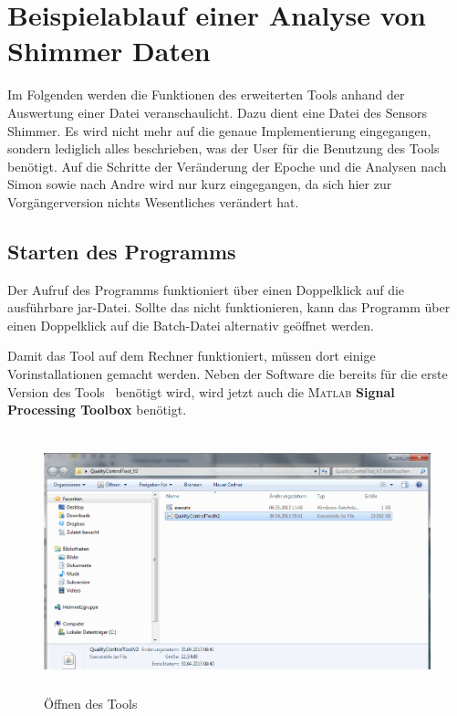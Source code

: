 \documentclass[onecolumn,german]{article}
\begin{document}
\section{Beispielablauf einer Analyse von Shimmer Daten}\label{Beispielablauf}

Im Folgenden werden die Funktionen des erweiterten Tools anhand der Auswertung einer Datei veranschaulicht. Dazu dient eine Datei des Sensors Shimmer. Es wird nicht mehr auf die genaue Implementierung eingegangen, sondern lediglich alles beschrieben, was der User für die Benutzung des Tools benötigt.
Auf die Schritte der Veränderung der Epoche und die Analysen nach Simon sowie nach Andre wird nur kurz eingegangen, da sich hier zur Vorgängerversion nichts Wesentliches verändert hat.

\subsection{Starten des Programms}
Der Aufruf des Programms funktioniert über einen Doppelklick auf die ausführbare jar-Datei. Sollte das nicht funktionieren, kann das Programm über einen Doppelklick auf die Batch-Datei alternativ geöffnet werden.\newline

Damit das Tool auf dem Rechner funktioniert, müssen dort einige Vorinstallationen gemacht werden. Neben der Software die bereits für die erste Version des Tools~\cite{idp} benötigt wird, wird jetzt auch die \textsc{Matlab} \textbf{Signal Processing Toolbox} benötigt.

\begin{figure}[H]
\centerline{
\includegraphics[width=140mm, height=75mm]{Abbildungen/OpenTool.png}
}
\caption {Öffnen des Tools}

\end{figure}
\end{document}
